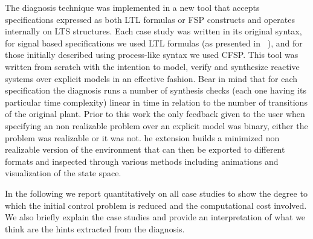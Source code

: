 The diagnosis technique was implemented in a new tool that accepts specifications expressed as both LTL formulas or FSP constructs and operates internally on LTS structures. Each case study was written in its original syntax, for signal based specifications we used LTL formulas (as presented in ~\cite{Bloem:2012}), and for those initially described using process-like syntax we used CFSP. This tool was written from scratch with the intention to model, verify and synthesize reactive systems over explicit models in an effective fashion. Bear in mind that for each specification the diagnosis runs a number of synthesis checks (each one having its particular time complexity) linear in time in relation to the number of transitions of the original plant.
Prior to this work the only feedback given to the user  when specifying an non realizable problem over an explicit model was binary, either the problem was realizable or it was not.
he extension builds a minimized non realizable version of the environment that can then be exported to different formats and inspected through various methods including animations and visualization of the state space.

In the following we report quantitatively on all case studies to show the degree to which the initial control problem is reduced and the computational cost involved. We also briefly explain the case studies and provide an interpretation of what we think are the hints extracted from the diagnosis. 

